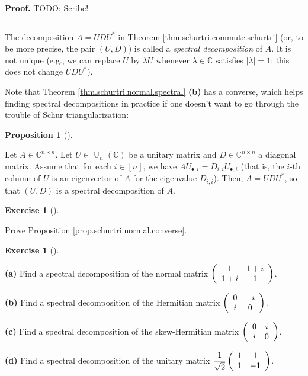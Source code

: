 \documentclass[numbers=enddot,12pt,final,onecolumn,notitlepage]{scrartcl}%
\newcounter{exer}
\numberwithin{exer}{subsection}
\theoremstyle{definition}
\newtheorem{prop}[theo]{Proposition}
\newenvironment{proposition}[1][]
{\begin{prop}[#1]\begin{leftbar}}
{\end{leftbar}\end{prop}}
\newtheorem{exmp}[exer]{Exercise}
\newenvironment{exercise}[1][]
{\begin{exmp}[#1]\begin{leftbar}}
{\end{leftbar}\end{exmp}}
\newenvironment{proof}[1][Proof]{\noindent\textbf{#1.} }{\ \rule{0.5em}{0.5em}}
\begin{document}
\begin{proof}
TODO: Scribe!
\end{proof}

The decomposition $A=UDU^{\ast}$ in Theorem
\ref{thm.schurtri.commute.schurtri} (or, to be more precise, the pair $\left(
U,D\right)  $) is called a \emph{spectral decomposition} of $A$. It is not
unique (e.g., we can replace $U$ by $\lambda U$ whenever $\lambda\in
\mathbb{C}$ satisfies $\left\vert \lambda\right\vert =1$; this does not change
$UDU^{\ast}$).

Note that Theorem \ref{thm.schurtri.normal.spectral} \textbf{(b)} has a
converse, which helps finding spectral decompositions in practice if one
doesn't want to go through the trouble of Schur triangularization:

\begin{proposition}
\label{prop.schurtri.normal.converse}Let $A\in\mathbb{C}^{n\times n}$. Let
$U\in\operatorname*{U}\nolimits_{n}\left(  \mathbb{C}\right)  $ be a unitary
matrix and $D\in\mathbb{C}^{n\times n}$ a diagonal matrix. Assume that for
each $i\in\left[  n\right]  $, we have $AU_{\bullet,i}=D_{i,i}U_{\bullet,i}$
(that is, the $i$-th column of $U$ is an eigenvector of $A$ for the eigenvalue
$D_{i,i}$). Then, $A=UDU^{\ast}$, so that $\left(  U,D\right)  $ is a spectral
decomposition of $A$.
\end{proposition}

\begin{exercise}
 Prove Proposition \ref{prop.schurtri.normal.converse}.
\end{exercise}

\begin{exercise}
\label{exe.schurtri.normal.examples} \textbf{(a)} Find a spectral
decomposition of the normal matrix $\left(
\begin{array}
[c]{cc}%
1 & 1+i\\
1+i & 1
\end{array}
\right)  $. \medskip

\textbf{(b)} Find a spectral decomposition of the Hermitian matrix $\left(
\begin{array}
[c]{cc}%
0 & -i\\
i & 0
\end{array}
\right)  $. \medskip

\textbf{(c)} Find a spectral decomposition of the skew-Hermitian matrix
$\left(
\begin{array}
[c]{cc}%
0 & i\\
i & 0
\end{array}
\right)  $. \medskip

\textbf{(d)} Find a spectral decomposition of the unitary matrix $\dfrac
{1}{\sqrt{2}}\left(
\begin{array}
[c]{cc}%
1 & 1\\
1 & -1
\end{array}
\right)  $.
\end{exercise}
\end{document}
